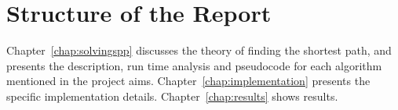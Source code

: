 \section{Structure of the Report}
Chapter~\ref{chap:solvingspp} discusses the theory of finding the shortest path,
and presents the description, run time analysis and pseudocode for each algorithm mentioned in the project aims.
Chapter~\ref{chap:implementation} presents the specific implementation details.
Chapter~\ref{chap:results} shows results.
